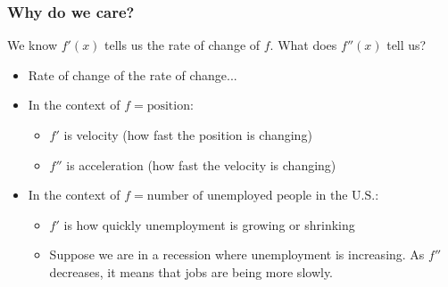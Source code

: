 \subsubsection{Why do we care?}
We know $f'(x)$ tells us the rate of change of $f$. What does $f''(x)$ tell us?
\begin{itemize}
    \item Rate of change of the rate of change...
    \item In the context of $f = \text{position}$:
    \begin{itemize}
        \item $f'$ is velocity (how fast the position is changing)
        \item $f''$ is acceleration (how fast the velocity is changing)
    \end{itemize}
    \item In the context of $f = \text{number of unemployed people in the U.S.}$:
    \begin{itemize}
        \item $f'$ is how quickly unemployment is growing or shrinking
        \item Suppose we are in a recession where unemployment is increasing. As $f''$ decreases, it means that jobs are being more slowly.
    \end{itemize}
\end{itemize}
